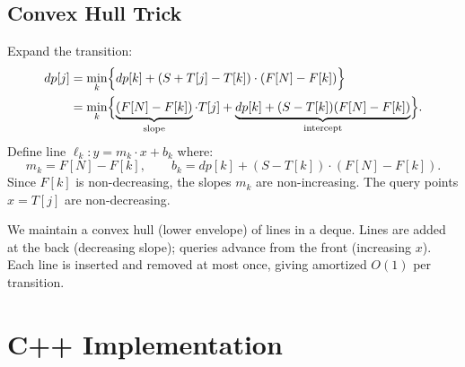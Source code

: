 \documentclass[11pt,a4paper]{article}
\begin{document}
\subsection{Convex Hull Trick}
Expand the transition:
\begin{align*}
  dp[j] &= \min_{k} \Bigl\{
    dp[k] + (S + T[j] - T[k]) \cdot (F[N] - F[k])
  \Bigr\} \\
  &= \min_{k} \Bigl\{
    \underbrace{(F[N] - F[k])}_{\text{slope}} \cdot T[j]
    + \underbrace{dp[k] + (S - T[k])(F[N] - F[k])}_{\text{intercept}}
  \Bigr\}.
\end{align*}
Define line $\ell_k: y = m_k \cdot x + b_k$ where:
\[
  m_k = F[N] - F[k], \qquad
  b_k = dp[k] + (S - T[k]) \cdot (F[N] - F[k]).
\]
Since $F[k]$ is non-decreasing, the slopes $m_k$ are non-increasing.
The query points $x = T[j]$ are non-decreasing.

We maintain a convex hull (lower envelope) of lines in a deque. Lines
are added at the back (decreasing slope); queries advance from the
front (increasing $x$). Each line is inserted and removed at most once,
giving amortized $O(1)$ per transition.

\section{C++ Implementation}
\end{document}
